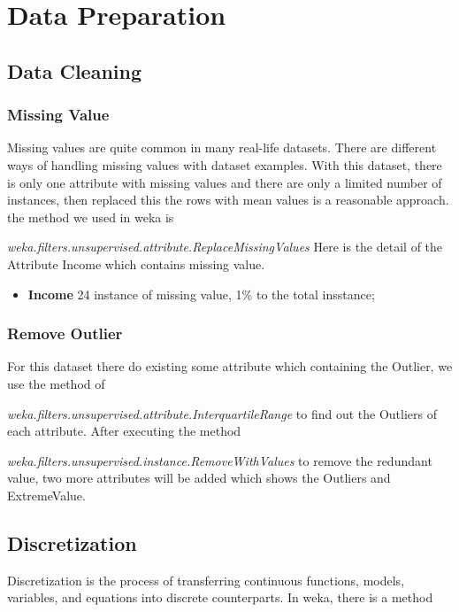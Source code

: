 \chapter{Data Preparation}

\section{Data Cleaning}

\subsection{Missing Value}
Missing values are quite common in many real-life datasets. There are different ways of handling missing values with dataset examples.
With this dataset, there is only one attribute with missing values and there are only a limited number of instances, then replaced this the rows with mean values is a reasonable approach.
the method we used in weka is 

\textit{weka.filters.unsupervised.attribute.ReplaceMissingValues}
Here is the detail of the Attribute Income which contains missing value.
\begin{itemize}
    \item \textbf{Income} 24 instance of missing value, 1\% to the total insstance;
\end{itemize}


\subsection{Remove Outlier}
For this dataset there do existing some attribute which containing the Outlier, we use the method of 

\textit{weka.filters.unsupervised.attribute.InterquartileRange} to find out the Outliers of each attribute.
After executing the method 

\textit{weka.filters.unsupervised.instance.RemoveWithValues} to remove the redundant value, two more attributes will be added which shows the Outliers and ExtremeValue. 

\section{Discretization}
Discretization is the process of transferring continuous functions, models, variables, and equations into discrete counterparts.  
In weka, there is a method 

